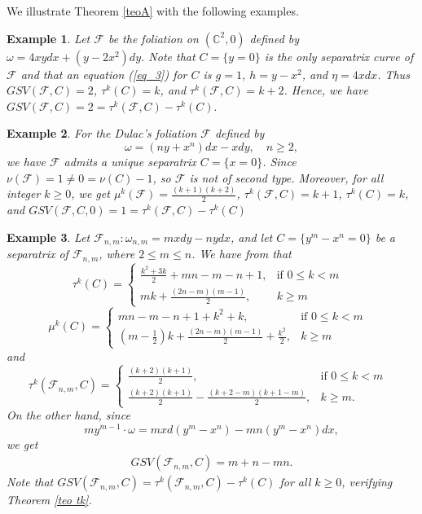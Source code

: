 \documentclass[12pt,letterpaper]{amsart}
\newcommand{\F}{\mathcal{F}}
\newtheorem{example}{Example}[section]
\begin{document}
We illustrate Theorem \ref{teoA} with the following examples.
\begin{example}
     Let $\F$ be the foliation on $(\mathbb{C}^{2},0)$ defined by $\omega = 4xydx + (y - 2x^{2})dy$. Note that $C = \{y = 0\}$ is the only separatrix curve of $\F$ and that an equation (\ref{eq_3}) for $C$ is $g = 1$, $h = y - x^{2}$, and $\eta = 4xdx$. Thus $GSV(\F,C)=2$, $\tau^k(C)=k$, and $\tau^{k}(\F,C)=k+2$. Hence, we have $GSV(\F,C)= 2=\tau^{k}(\F, C) - \tau^{k}(C).$
\end{example}
\begin{example}
    For the Dulac's foliation $\F$ defined by \[\omega=(ny+x^{n})dx-xdy,\quad n\geq 2,\] we have $\F$ admits a unique separatrix $C=\{x=0\}$. Since $\nu(\F)=1\neq 0=\nu(C)-1$, so $\F$ is not of second type.
    Moreover, for all integer $k\geq 0$, we get
    $\mu^{k}(\F)=\frac{(k+1)(k+2)}{2}$, $\tau^{k}(\F,C)=k+1$, $\tau^{k}(C)=k$, and $GSV(\F,C,0)= 1=\tau^{k}(\F, C) - \tau^{k}(C)$
\end{example}
\begin{example}
    Let $\F_{n,m}:\omega_{n,m}=mxdy-nydx$, and let $C=\{y^m-x^n=0\}$ be a separatrix of $\F_{n,m}$, where $2\leq m\leq n$. 
    We have from \cite[Theorem A, item 1]{Tjurina 2} that
    $$
\tau^{k}(C)=\begin{cases}
			\frac{k^2+3k}{2}+mn-m-n+1, & \text{if $0\leq k< m$ }\\
            mk+\frac{(2n-m)(m-1)}{2}, & \text{$k\geq m$}
		 \end{cases}
$$
$$
\mu^{k}(C)=\begin{cases}
			mn-m-n+1+k^2+k, & \text{if $0\leq k< m$ }\\
            \left(m-\frac{1}{2}\right)k+\frac{(2n-m)(m-1)}{2}+\frac{k^2}{2}, & \text{$k\geq m$}
		 \end{cases}
$$
and 
$$
\tau^{k}(\F_{n,m},C)=\begin{cases}
			\frac{(k+2)(k+1)}{2}, & \text{if $0\leq k< m$ }\\
            \frac{(k+2)(k+1)}{2}-\frac{(k+2-m)(k+1-m)}{2}, & \text{$k\geq m$.}
		 \end{cases}
$$
On the other hand, since 
    \[my^{m-1}\cdot\omega=mx d(y^m-x^n)-mn(y^m-x^n)dx,\] we get
    \begin{eqnarray*}
        GSV(\F_{n,m},C)=m+n-mn.
        \end{eqnarray*}
Note that $GSV(\F_{n,m},C)=\tau^{k}(\F_{n,m},C)-\tau^{k}(C)$ for all $k\geq 0$, verifying Theorem \ref{teo tk}.
\end{example}
\end{document}
